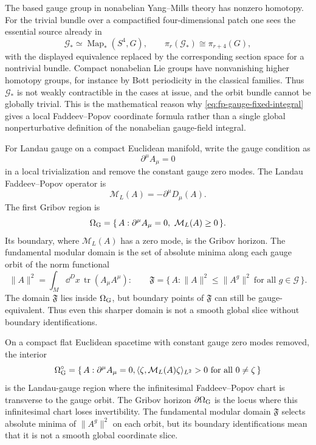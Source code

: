 The based gauge group in nonabelian Yang--Mills theory has nonzero homotopy.
For the trivial bundle over a compactified four-dimensional patch one sees the
essential source already in
\begin{equation}
  \mathcal G_\ast\simeq \operatorname{Map}_\ast(S^4,G),
  \qquad
  \pi_r(\mathcal G_\ast)\cong \pi_{r+4}(G),
  \label{eq:based-gauge-group-homotopy-shift}
\end{equation}
with the displayed equivalence replaced by the corresponding section space for
a nontrivial bundle.  Compact nonabelian Lie groups have nonvanishing higher
homotopy groups, for instance by Bott periodicity in the classical families.
Thus \(\mathcal G_\ast\) is not weakly contractible in the cases at issue, and
the orbit bundle cannot be globally trivial.  This is the mathematical reason
why \eqref{eq:fp-gauge-fixed-integral} gives a local Faddeev--Popov coordinate
formula rather than a single global nonperturbative definition of the
nonabelian gauge-field integral.

\begin{definition}
\label{def:gribov-region-fundamental-domain}
For Landau gauge on a compact Euclidean manifold, write the gauge condition as
\[
  \partial^\mu A_\mu=0
\]
in a local trivialization and remove the constant gauge zero modes.  The
Landau Faddeev--Popov operator is
\[
  \mathcal M_L(A)=-\partial^\mu D_\mu(A).
\]
The first Gribov region is
\[
  \Omega_{\rm G}
  =
  \{\,A:\partial^\mu A_\mu=0,\ \mathcal M_L(A)\ge0\,\}.
\]
Its boundary, where \(\mathcal M_L(A)\) has a zero mode, is the Gribov
horizon.  The fundamental modular domain is the set of absolute minima along
each gauge orbit of the norm functional
\[
  \|A\|^2=\int_M\dd^D x\,\operatorname{tr}(A_\mu A^\mu):
  \qquad
  \mathfrak F
  =
  \{\,A:\|A\|^2\le \|A^g\|^2\ \text{for all }g\in\mathcal G\,\}.
\]
The domain \(\mathfrak F\) lies inside \(\Omega_{\rm G}\), but boundary points
of \(\mathfrak F\) can still be gauge-equivalent.  Thus even this sharper
domain is not a smooth global slice without boundary identifications.
\end{definition}

\begin{proposition}
\label{prop:landau-gribov-free-regime}
On a compact flat Euclidean spacetime with constant gauge zero modes removed,
the interior
\[
  \Omega_{\rm G}^{\circ}
  =
  \{\,A:\partial^\mu A_\mu=0,
  \langle\zeta,\mathcal M_L(A)\zeta\rangle_{L^2}>0
  \text{ for all }0\ne\zeta\,\}
\]
is the Landau-gauge region where the infinitesimal Faddeev--Popov chart is
transverse to the gauge orbit.  The Gribov horizon
\(\partial\Omega_{\rm G}\) is the locus where this infinitesimal chart loses
invertibility.  The fundamental modular domain \(\mathfrak F\) selects
absolute minima of \(\|A^g\|^2\) on each orbit, but its boundary
identifications mean that it is not a smooth global coordinate slice.
\end{proposition}


